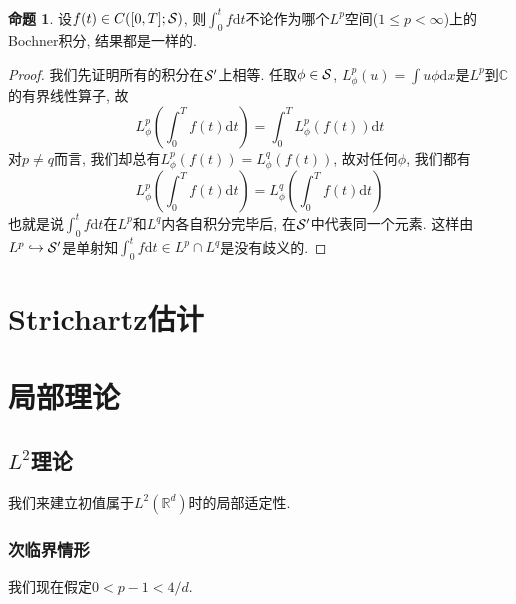 \documentclass{ctexbook}
\theoremstyle{definition}
\newtheorem{proposition}[definition]{命题}
\theoremstyle{remark}
\newcommand{\dif}{\mathrm{d}}
\begin{document}
\begin{proposition}
设$f(t)\in C([0,T];{\cal S})$, 则$\int_0^tf\dif t$不论作为哪个$L^p$空间($1\le p<\infty$)上的Bochner积分, 结果都是一样的. 
\end{proposition}
\begin{proof}
我们先证明所有的积分在${\cal S}'$上相等. 任取$\phi\in{\cal S}$, $L_\phi^p(u)=\int u\phi\dif x$是$L^p$到$\mathbb{C}$的有界线性算子, 故
$$L_\phi^p\left(\int_0^Tf(t)\dif t\right)=\int_0^TL_\phi^p(f(t))\dif t$$
对$p\ne q$而言, 我们却总有$L^p_\phi(f(t))=L^q_\phi(f(t))$, 故对任何$\phi$, 我们都有
$$L_\phi^p\left(\int_0^Tf(t)\dif t\right)=L_\phi^q\left(\int_0^Tf(t)\dif t\right)$$
也就是说$\int_0^tf\dif t$在$L^p$和$L^q$内各自积分完毕后, 在${\cal S}'$中代表同一个元素. 这样由$L^p\hookrightarrow{\cal S}'$是单射知$\int_0^tf\dif t\in L^p\cap L^q$是没有歧义的. 
\end{proof}
\section{Strichartz估计}
\section{局部理论}
\subsection{$L^2$理论}
我们来建立初值属于$L^2(\mathbb{R}^d)$时的局部适定性. 

\subsubsection{次临界情形}
我们现在假定$0<p-1<4/d$. 
\end{document}
